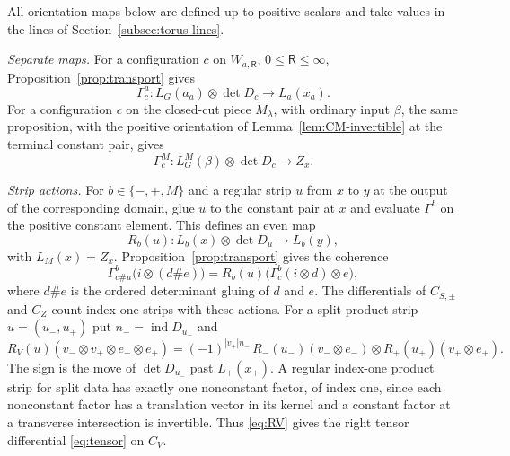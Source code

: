 \documentclass[11pt]{amsart}
\theoremstyle{definition}
\theoremstyle{remark}
\theoremstyle{plain}
\numberwithin{equation}{section}
\newcommand{\ind}{\operatorname{ind}}
\begin{document}
All orientation maps below are defined up to positive scalars and take
values in the lines of Section~\ref{subsec:torus-lines}.

\emph{Separate maps.} For a configuration $c$ on $W_{a,\mathsf R}$,
$0\le\mathsf R\le\infty$, Proposition~\ref{prop:transport} gives
\[
 \Gamma^a_c:L_G(a_a)\otimes\det D_c\longrightarrow L_a(x_a).
\]
For a configuration $c$ on the closed-cut piece $M_\lambda$, with
ordinary input $\beta$, the same proposition, with the positive
orientation of Lemma~\ref{lem:CM-invertible} at the terminal constant
pair, gives
\[
 \Gamma^M_c:L^M_G(\beta)\otimes\det D_c\longrightarrow Z_x .
\]

\emph{Strip actions.} For $b\in\{-,+,M\}$ and a regular strip $u$
from $x$ to $y$ at the output of the corresponding domain, glue $u$ to
the constant pair at $x$ and evaluate $\Gamma^b$ on the positive
constant element. This defines an even map
\[
 R_b(u):L_b(x)\otimes\det D_u\longrightarrow L_b(y),
\]
with $L_M(x)=Z_x$. Proposition~\ref{prop:transport} gives the
coherence
\begin{equation}\label{eq:strip-coherence}
 \Gamma^b_{c\#u}\bigl(i\otimes(d\# e)\bigr)
 =R_b(u)\bigl(\Gamma^b_c(i\otimes d)\otimes e\bigr),
\end{equation}
where $d\#e$ is the ordered determinant gluing of $d$ and $e$. The differentials of
$C_{S,\pm}$ and $C_Z$ count index-one strips with these actions. For
a split product strip $u=(u_-,u_+)$ put $n_-=\ind D_{u_-}$ and
\begin{equation}\label{eq:RV}
 R_V(u)(v_-\otimes v_+\otimes e_-\otimes e_+)
 =(-1)^{|v_+|n_-}\,
   R_-(u_-)(v_-\otimes e_-)\otimes R_+(u_+)(v_+\otimes e_+).
\end{equation}
The sign is the move of $\det D_{u_-}$ past $L_+(x_+)$. A regular
index-one product strip for split data has exactly one nonconstant
factor, of index one, since each nonconstant factor has a translation
vector in its kernel and a constant factor at a transverse
intersection is invertible. Thus \eqref{eq:RV} gives the right
tensor differential \eqref{eq:tensor} on $C_V$.
\end{document}
